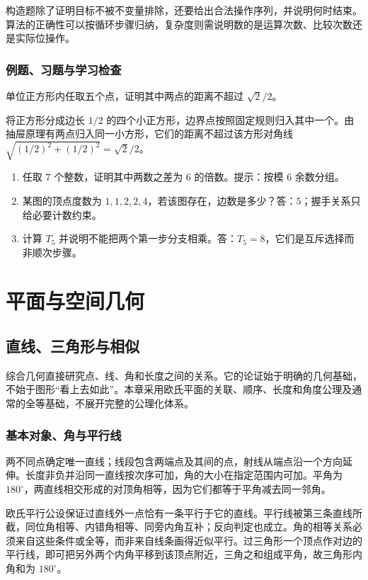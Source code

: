 \documentclass[UTF8]{ctexbook}
\begin{document}
构造题除了证明目标不被不变量排除，还要给出合法操作序列，并说明何时结束。算法的正确性可以按循环步骤归纳，复杂度则需说明数的是运算次数、比较次数还是实际位操作。

\section{例题、习题与学习检查}
\begin{example}
单位正方形内任取五个点，证明其中两点的距离不超过 $\sqrt2/2$。
\end{example}
\begin{solve}
将正方形分成边长 $1/2$ 的四个小正方形，边界点按照固定规则归入其中一个。由抽屉原理有两点归入同一小方形，它们的距离不超过该方形对角线 $\sqrt{(1/2)^2+(1/2)^2}=\sqrt2/2$。
\end{solve}
\begin{enumerate}
\item 任取 $7$ 个整数，证明其中两数之差为 $6$ 的倍数。提示：按模 $6$ 余数分组。
\item 某图的顶点度数为 $1,1,2,2,4$，若该图存在，边数是多少？答：$5$；握手关系只给必要计数约束。
\item 计算 $T_5$ 并说明不能把两个第一步分支相乘。答：$T_5=8$，它们是互斥选择而非顺次步骤。
\end{enumerate}

\part{平面与空间几何}

\chapter{直线、三角形与相似}
\label{chap:em-triangles}
综合几何直接研究点、线、角和长度之间的关系。它的论证始于明确的几何基础，不始于图形“看上去如此”。本章采用欧氏平面的关联、顺序、长度和角度公理及通常的全等基础，不展开完整的公理化体系。

\section{基本对象、角与平行线}
两不同点确定唯一直线；线段包含两端点及其间的点，射线从端点沿一个方向延伸。长度非负并沿同一直线按次序可加，角的大小在指定范围内可加。平角为 $180^\circ$，两直线相交形成的对顶角相等，因为它们都等于平角减去同一邻角。

欧氏平行公设保证过直线外一点恰有一条平行于它的直线。平行线被第三条直线所截，同位角相等、内错角相等、同旁内角互补；反向判定也成立。角的相等关系必须来自这些条件或全等，而非来自线条画得近似平行。过三角形一个顶点作对边的平行线，即可把另外两个内角平移到该顶点附近，三角之和组成平角，故三角形内角和为 $180^\circ$。
\end{document}
